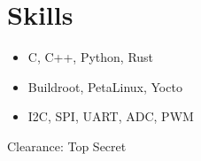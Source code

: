 \section*{Skills}
\begin{itemize}[itemsep=-0.5em]
    \item C, C++, Python, Rust
    \item Buildroot, PetaLinux, Yocto
    \item I2C, SPI, UART, ADC, PWM
\end{itemize}
Clearance: Top Secret
